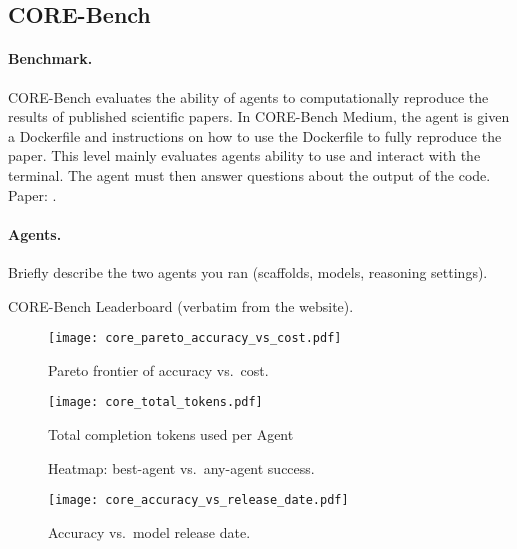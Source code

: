 \subsection{CORE-Bench}\label{app:corebench}

\paragraph{Benchmark.}
CORE-Bench evaluates the ability of agents to computationally reproduce the results of published scientific papers. In CORE-Bench Medium, the agent is given a Dockerfile and instructions on how to use the Dockerfile to fully reproduce the paper. This level mainly evaluates agents ability to use and interact with the terminal. The agent must then answer questions about the output of the code.
Paper: \cite{corebench}.

\paragraph{Agents.}
Briefly describe the two agents you ran (scaffolds, models, reasoning settings).


\begin{table}[t]
  \centering
  \caption{CORE-Bench Leaderboard (verbatim from the website).}
  \label{tab:corebench_full}
  
\end{table}


\begin{figure}[htbp]
  \centering
  \texttt{[image: core\_pareto\_accuracy\_vs\_cost.pdf]}
  \caption{Pareto frontier of accuracy vs.\ cost.}
  \label{fig:core_pareto}
\end{figure}

\begin{figure}[htbp]
  \centering
  \texttt{[image: core\_total\_tokens.pdf]}
  \caption{Total completion tokens used per Agent}
  \label{fig:core_tokens}
\end{figure}

\begin{figure*}[t]
  \centering
  \caption{Heatmap: best-agent vs.\ any-agent success.}
  \label{fig:core_heatmap}
\end{figure*}

\begin{figure}[htbp]
  \centering
  \texttt{[image: core\_accuracy\_vs\_release\_date.pdf]}
  \caption{Accuracy vs.\ model release date.}
  \label{fig:core_release}
\end{figure}

\clearpage
